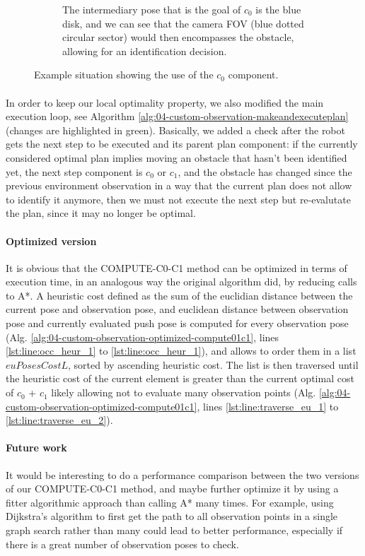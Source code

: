 \begin{figure}[H]
\begin{subfigure}{.45\textwidth}
  \caption{The intermediary pose that is the goal of $c_{0}$ is the blue disk, and we can see that the camera FOV (blue dotted circular sector) would then encompasses the obstacle, allowing for an identification decision.}
  \label{fig:observation_02}
\end{subfigure}
\caption{Example situation showing the use of the $c_{0}$ component.}
\label{fig:observation_example}
\end{figure}

\paragraph{} In order to keep our local optimality property, we also modified the main execution loop, see Algorithm \ref{alg:04-custom-observation-makeandexecuteplan} (changes are highlighted in green). Basically, we added a check after the robot gets the next step to be executed and its parent plan component: if the currently considered optimal plan implies moving an obstacle that hasn't been identified yet, the next step component is $c_{0}$ or $c_{1}$, and the obstacle has changed since the previous environment observation in a way that the current plan does not allow to identify it anymore, then we must not execute the next step but re-evalutate the plan, since it may no longer be optimal.

\paragraph{Optimized version} It is obvious that the COMPUTE-C0-C1 method can be optimized in terms of execution time, in an analogous way the original algorithm did, by reducing calls to A*. A heuristic cost defined as the sum of the euclidian distance between the current pose and observation pose, and euclidean distance between observation pose and currently evaluated push pose is computed for every observation pose (Alg. \ref{alg:04-custom-observation-optimized-compute01c1}, lines \ref{lst:line:occ_heur_1} to \ref{lst:line:occ_heur_1}), and allows to order them in a list $euPosesCostL$, sorted by ascending heuristic cost. The list is then traversed until the heuristic cost of the current element is greater than the current optimal cost of $c_{0}$ + $c_{1}$ likely allowing not to evaluate many observation points (Alg. \ref{alg:04-custom-observation-optimized-compute01c1}, lines \ref{lst:line:traverse_eu_1} to \ref{lst:line:traverse_eu_2}).

\paragraph{Future work} It would be interesting to do a performance comparison between the two versions of our COMPUTE-C0-C1 method, and maybe further optimize it by using a fitter algorithmic approach than calling A* many times. For example, using Dijkstra's algorithm to first get the path to all observation points in a single graph search rather than many could lead to better performance, especially if there is a great number of observation poses to check.

